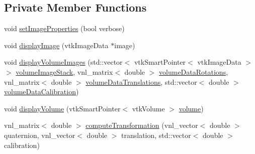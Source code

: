 \subsection*{Private Member Functions}
\begin{DoxyCompactItemize}
\item 
void \hyperlink{class_q_v_t_k_image_widget_a148e0e9402c79f81afd1079754aec7d2}{set\-Image\-Properties} (bool verbose)
\item 
void \hyperlink{class_q_v_t_k_image_widget_a48d0dad3ffc56126e2f3cbf14ee0fe98}{display\-Image} (vtk\-Image\-Data $\ast$image)
\item 
void \hyperlink{class_q_v_t_k_image_widget_a0078c9008605b2123ef6e99a71db4cd3}{display\-Volume\-Images} (std\-::vector$<$ vtk\-Smart\-Pointer$<$ vtk\-Image\-Data $>$ $>$ \hyperlink{class_q_v_t_k_image_widget_a2b96df48cde8c89ddb4a2a76c0b619c3}{volume\-Image\-Stack}, vnl\-\_\-matrix$<$ double $>$ \hyperlink{class_q_v_t_k_image_widget_ab9aba72f9fc8e922555b96f30bd1dba3}{volume\-Data\-Rotations}, vnl\-\_\-matrix$<$ double $>$ \hyperlink{class_q_v_t_k_image_widget_a039e71a63cbbba8d95894df141fa6986}{volume\-Data\-Translations}, std\-::vector$<$ double $>$ \hyperlink{class_q_v_t_k_image_widget_ad5069809b7e74c437884499f2aaaf0a0}{volume\-Data\-Calibration})
\item 
void \hyperlink{class_q_v_t_k_image_widget_af5a9192eb09b6db8582160aa527fc685}{display\-Volume} (vtk\-Smart\-Pointer$<$ vtk\-Volume $>$ \hyperlink{class_q_v_t_k_image_widget_a37424d6e8fd36a77aa8ab79e4aee5acf}{volume})
\item 
vnl\-\_\-matrix$<$ double $>$ \hyperlink{class_q_v_t_k_image_widget_a018d108cf5dbc574dcecf78fe6904a8d}{compute\-Transformation} (vnl\-\_\-vector$<$ double $>$ quaternion, vnl\-\_\-vector$<$ double $>$ translation, std\-::vector$<$ double $>$ calibration)
\end{DoxyCompactItemize}
